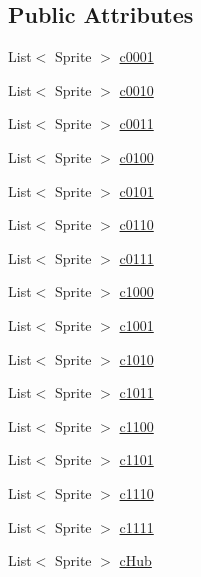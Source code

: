 \subsection*{Public Attributes}
\begin{DoxyCompactItemize}
\item 
List$<$ Sprite $>$ \mbox{\hyperlink{class_chunk_sprites_a36cf2ce2f744ce381fb5c76df8c4fc50}{c0001}}
\item 
List$<$ Sprite $>$ \mbox{\hyperlink{class_chunk_sprites_a8ba71bfadb5b574f85b165ac1664fdd9}{c0010}}
\item 
List$<$ Sprite $>$ \mbox{\hyperlink{class_chunk_sprites_aabb06f4f31b60765a7ce3107505da123}{c0011}}
\item 
List$<$ Sprite $>$ \mbox{\hyperlink{class_chunk_sprites_a42214aec09db89ee79e62dc41f81e6b3}{c0100}}
\item 
List$<$ Sprite $>$ \mbox{\hyperlink{class_chunk_sprites_a81c9de1dbe228e43506ff51f841c2166}{c0101}}
\item 
List$<$ Sprite $>$ \mbox{\hyperlink{class_chunk_sprites_a4b155b738bb5ebc714e8eafa07e29a56}{c0110}}
\item 
List$<$ Sprite $>$ \mbox{\hyperlink{class_chunk_sprites_a9f5b86d62261861f42e6b4654a5f106c}{c0111}}
\item 
List$<$ Sprite $>$ \mbox{\hyperlink{class_chunk_sprites_a945934271774eb74b06ebc7f274b4430}{c1000}}
\item 
List$<$ Sprite $>$ \mbox{\hyperlink{class_chunk_sprites_a3da5f025b8e42646ca3fd78339c70cf5}{c1001}}
\item 
List$<$ Sprite $>$ \mbox{\hyperlink{class_chunk_sprites_afc2f05d890635b391a2feca57379776b}{c1010}}
\item 
List$<$ Sprite $>$ \mbox{\hyperlink{class_chunk_sprites_a88c4a9896daa6fb90574de5fa700112c}{c1011}}
\item 
List$<$ Sprite $>$ \mbox{\hyperlink{class_chunk_sprites_afc20b135b9cbcb7f00759a90cc5fe5aa}{c1100}}
\item 
List$<$ Sprite $>$ \mbox{\hyperlink{class_chunk_sprites_acddac083bf262cd668417a8488a0efb9}{c1101}}
\item 
List$<$ Sprite $>$ \mbox{\hyperlink{class_chunk_sprites_a2e41de104497bc5e9a531b1c281e88b5}{c1110}}
\item 
List$<$ Sprite $>$ \mbox{\hyperlink{class_chunk_sprites_a6e669d816ca0b936f893b5456958b2e1}{c1111}}
\item 
List$<$ Sprite $>$ \mbox{\hyperlink{class_chunk_sprites_ad3790f456c356fe27f3da510f399f6a9}{c\+Hub}}
\end{DoxyCompactItemize}


